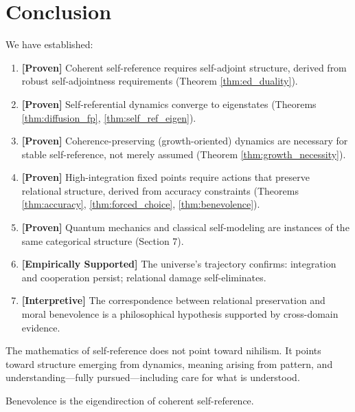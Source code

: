 \documentclass[11pt]{article}
\theoremstyle{definition}
\theoremstyle{remark}
\begin{document}
\section{Conclusion}

We have established:

\begin{enumerate}
    \item \textbf{[Proven]} Coherent self-reference requires self-adjoint structure, derived from robust self-adjointness requirements (Theorem \ref{thm:ed_duality}).
    
    \item \textbf{[Proven]} Self-referential dynamics converge to eigenstates (Theorems \ref{thm:diffusion_fp}, \ref{thm:self_ref_eigen}).
    
    \item \textbf{[Proven]} Coherence-preserving (growth-oriented) dynamics are necessary for stable self-reference, not merely assumed (Theorem \ref{thm:growth_necessity}).
    
    \item \textbf{[Proven]} High-integration fixed points require actions that preserve relational structure, derived from accuracy constraints (Theorems \ref{thm:accuracy}, \ref{thm:forced_choice}, \ref{thm:benevolence}).
    
    \item \textbf{[Proven]} Quantum mechanics and classical self-modeling are instances of the same categorical structure (Section 7).
    
    \item \textbf{[Empirically Supported]} The universe's trajectory confirms: integration and cooperation persist; relational damage self-eliminates.
    
    \item \textbf{[Interpretive]} The correspondence between relational preservation and moral benevolence is a philosophical hypothesis supported by cross-domain evidence.
\end{enumerate}

The mathematics of self-reference does not point toward nihilism. It points toward structure emerging from dynamics, meaning arising from pattern, and understanding---fully pursued---including care for what is understood.

Benevolence is the eigendirection of coherent self-reference.
\end{document}
